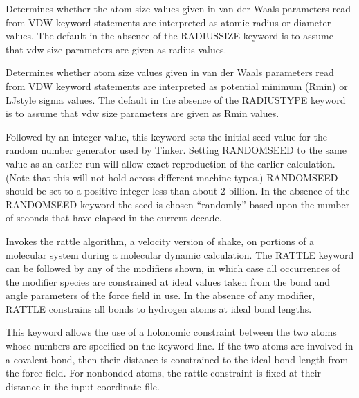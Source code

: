 \documentclass[letterpaper,11pt,english]{sphinxmanual}
\begin{document}
  Determines whether the atom size values given in van der Waals parameters read from VDW keyword statements are interpreted as atomic radius or diameter values. The default in the absence of the RADIUSSIZE keyword is to assume that vdw size parameters are given as radius values.

  Determines whether atom size values given in van der Waals parameters read from VDW keyword statements are interpreted as potential minimum (Rmin) or LJ\sphinxhyphen{}style sigma values. The default in the absence of the RADIUSTYPE keyword is to assume that vdw size parameters are given as Rmin values.

  Followed by an integer value, this keyword sets the initial seed value for the random number generator used by Tinker. Setting RANDOMSEED to the same value as an earlier run will allow exact reproduction of the earlier calculation. (Note that this will not hold across different machine types.) RANDOMSEED should be set to a positive integer less than about 2 billion. In the absence of the RANDOMSEED keyword the seed is chosen “randomly” based upon the number of seconds that have elapsed in the current decade.

  Invokes the rattle algorithm, a velocity version of shake, on portions of a molecular system during a molecular dynamic calculation. The RATTLE keyword can be followed by any of the modifiers shown, in which case all occurrences of the modifier species are constrained at ideal values taken from the bond and angle parameters of the force field in use. In the absence of any modifier, RATTLE constrains all bonds to hydrogen atoms at ideal bond lengths.

  This keyword allows the use of a holonomic constraint between the two atoms whose numbers are specified on the keyword line. If the two atoms are involved in a covalent bond, then their distance is constrained to the ideal bond length from the force field. For nonbonded atoms, the rattle constraint is fixed at their distance in the input coordinate file.


\end{document}

